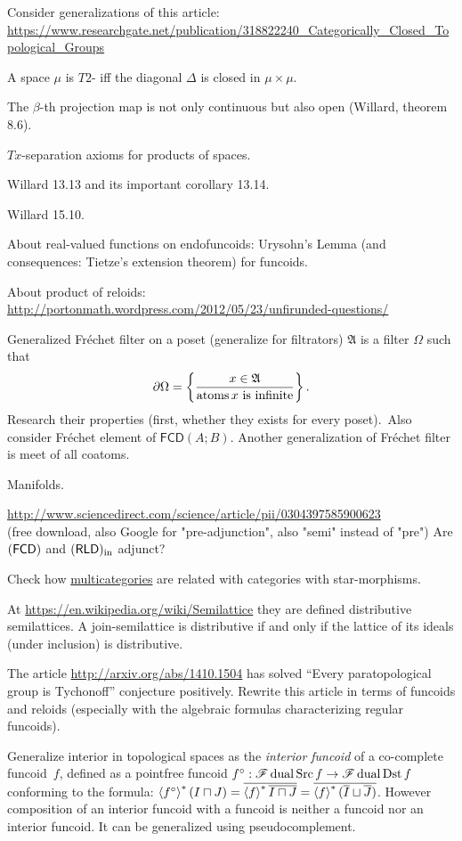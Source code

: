 \documentclass{amsart}
\begin{document}
Consider generalizations of this article: \\
\url{https://www.researchgate.net/publication/318822240_Categorically_Closed_Topological_Groups}

A space $\mu$ is $T 2$- iff the diagonal $\Delta$ is closed in $\mu\times\mu$.

The $\beta$-th projection map is not only continuous but also open (Willard, theorem 8.6).

$T x$-separation axioms for products of spaces.

Willard 13.13 and its important corollary 13.14.

Willard 15.10.

About real-valued functions on endofuncoids: Urysohn's Lemma (and consequences: Tietze's extension theorem) for funcoids.

About product of reloids:\\
\url{http://portonmath.wordpress.com/2012/05/23/unfirunded-questions/}

Generalized Fr\'echet filter on a poset (generalize for filtrators) $\mathfrak{A}$ is a filter $\Omega$ such that
\[ \partial\Omega = \left\{ \frac{x\in\mathfrak{A}}{\operatorname{atoms} x\text{ is infinite}}\right\}. \]
Research their properties (first, whether they exists for every poset).\
Also consider Fr\'echet element of $\mathsf{FCD}(A;B)$.
Another generalization of Fr\'echet filter is meet of all coatoms.

Manifolds.

\url{http://www.sciencedirect.com/science/article/pii/0304397585900623}\\
(free download, also Google for "pre-adjunction", also "semi" instead of "pre") Are $(\mathsf{FCD})$ and $(\mathsf{RLD})_{\mathrm{in}}$ adjunct?

Check how \href{http://ncatlab.org/nlab/show/multicategory}{multicategories}
are related with categories with star-morphisms.

At \url{https://en.wikipedia.org/wiki/Semilattice} they are defined distributive
semilattices. A join-semilattice is distributive if and only if the lattice of its ideals (under inclusion) is distributive.

The article \url{http://arxiv.org/abs/1410.1504} has solved ``Every paratopological group is Tychonoff'' conjecture positively.
Rewrite this article in terms of funcoids and reloids (especially with the algebraic formulas characterizing regular funcoids).

Generalize interior in topological spaces as the \emph{interior funcoid} of a co-complete funcoid~$f$, defined as a pointfree funcoid
$f^\circ: \mathscr{F}\operatorname{dual}\operatorname{Src} f \rightarrow \mathscr{F}\operatorname{dual}\operatorname{Dst} f$ conforming to the formula:
$\left\langle f^{\circ}\right\rangle ^{\ast} (I \sqcap J) = \overline{\left\langle f\right\rangle ^{\ast} \overline{I \sqcap J}} = \overline{\left\langle f\right\rangle ^{\ast} ( \overline{I} \sqcup \overline{J} )}$.
However composition of an interior funcoid with a funcoid is neither a funcoid nor an interior funcoid.
It can be generalized using pseudocomplement.
\end{document}
